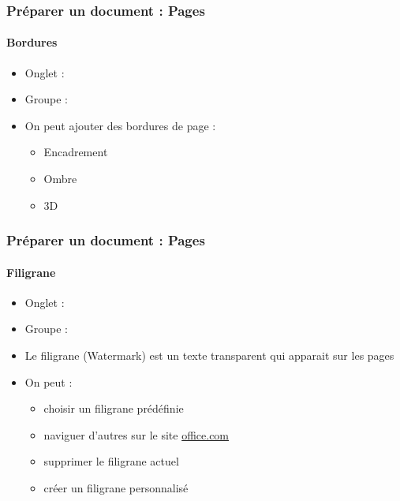 \documentclass[xcolor=table]{beamer}
\begin{document}
\begin{frame}[t]
\frametitle{Préparer un document : Pages}
\framesubtitle{Bordures}

\begin{minipage}{0.49\textwidth}
	\begin{itemize}
		\item Onglet : 
		\item Groupe : 
		\item On peut ajouter des bordures de page :
		\begin{itemize}
			\item Encadrement
			\item Ombre
			\item 3D
		\end{itemize}
	\end{itemize}
\end{minipage}
\begin{minipage}{0.50\textwidth}
\end{minipage}

\end{frame}

\begin{frame}[t]
\frametitle{Préparer un document : Pages}
\framesubtitle{Filigrane}

\begin{minipage}{0.49\textwidth}
	\begin{itemize}
		\item Onglet : 
		\item Groupe : 
		\item Le filigrane (Watermark) est un texte transparent qui apparait sur les pages
		\item On peut : 
		\begin{itemize}
			\item choisir un filigrane prédéfinie
			\item naviguer d'autres sur le site \url{office.com}
			\item supprimer le filigrane actuel 
			\item créer un filigrane personnalisé
		\end{itemize}
	\end{itemize}
\end{minipage}
\begin{minipage}{0.50\textwidth}
\end{minipage}

\end{frame}
\end{document}
